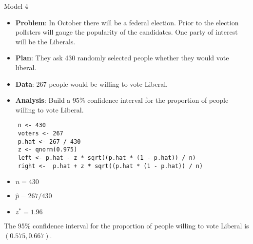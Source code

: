 \begin{Example}{Model 4}{}
    \begin{itemize}
        \item \textbf{Problem}: In October there will be a federal election. Prior to the election pollsters will gauge the popularity of the
              candidates. One party of interest will be the Liberals.
        \item \textbf{Plan}: They ask 430 randomly selected people whether they would vote liberal.
        \item \textbf{Data}: 267 people would be willing to vote Liberal.
        \item \textbf{Analysis}: Build a 95\% confidence interval for the proportion of people willing to vote Liberal.
    \end{itemize}
    \begin{verbatim}
    n <- 430
    voters <- 267
    p.hat <- 267 / 430
    z <- qnorm(0.975)
    left <- p.hat - z * sqrt((p.hat * (1 - p.hat)) / n)
    right <-  p.hat + z * sqrt((p.hat * (1 - p.hat)) / n)
    \end{verbatim}
    \begin{itemize}
        \item $ n=430 $
        \item $ \hat{p}=267/430 $
        \item $ z^*=1.96 $
    \end{itemize}
    The 95\% confidence interval for the proportion of people willing to vote Liberal
    is $ (0.575, 0.667) $.
\end{Example}

